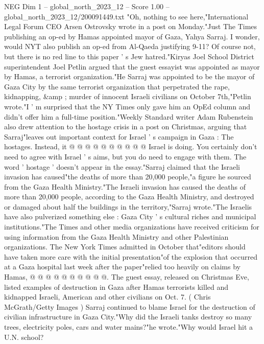 \begin{textsample}{NEG Dim 1 – global\_north\_2023\_12 – Score 1.00 – global\_north\_2023\_12/200091449.txt}  \label{ex:f1_neg_197}
"Oh, nothing to see here,"International Legal Forum CEO Arsen Ostrovsky wrote in a post on Monday."Just The Times publishing an op-ed by Hamas appointed mayor of Gaza, Yahya Sarraj.
I wonder, would NYT also publish an op-ed from Al-Qaeda justifying 9-11?
Of course not, but there is no red line to this paper ' s Jew hatred."Kiryas Joel School District superintendent Joel Petlin argued that the guest essayist was appointed as mayor by Hamas, a terrorist organization."He Sarraj was appointed to be the mayor of Gaza City by the same terrorist organization that perpetrated the rape, kidnapping, \&amp ; murder of innocent Israeli civilians on October 7th,"Petlin wrote."I ' m surprised that the NY Times only gave him an OpEd column and didn't offer him a full-time position."Weekly Standard writer Adam Rubenstein also drew attention to the hostage crisis in a post on Christmas, arguing that Sarraj"leaves out important context for Israel ' s campaign in Gaza : The hostages.
Instead, it @ @ @ @ @ @ @ @ @ @ Israel is doing.
You certainly don't need to agree with Israel ' s aims, but you do need to engage with them.
The word ' hostage ' doesn't appear in the essay."Sarraj claimed that the Israeli invasion has caused"the deaths of more than 20,000 people,"a figure he sourced from the Gaza Health Ministry."The Israeli invasion has caused the deaths of more than 20,000 people, according to the Gaza Health Ministry, and destroyed or damaged about half the buildings in the territory,"Sarraj wrote."The Israelis have also pulverized something else : Gaza City ' s cultural riches and municipal institutions."The Times and other media organizations have received criticism for using information from the Gaza Health Ministry and other Palestinian organizations.
The New York Times admitted in October that"editors should have taken more care with the initial presentation"of the explosion that occurred at a Gaza hospital last week after the paper"relied too heavily on claims by Hamas, @ @ @ @ @ @ @ @ @ @.
The guest essay, released on Christmas Eve, listed examples of destruction in Gaza after Hamas terrorists killed and kidnapped Israeli, American and other civilians on Oct. 7. ( Chris McGrath/Getty Images ) Sarraj continued to blame Israel for the destruction of civilian infrastructure in Gaza City."Why did the Israeli tanks destroy so many trees, electricity poles, cars and water mains?"he wrote."Why would Israel hit a U.N. school?

\end{textsample}
